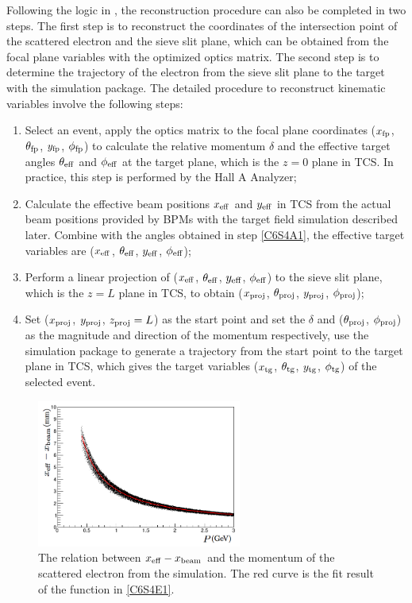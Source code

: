 Following the logic in , the reconstruction procedure can also be completed in two steps. The first step is to reconstruct the coordinates of the intersection point of the scattered electron and the sieve slit plane, which can be obtained from the focal plane variables with the optimized optics matrix. The second step is to determine the trajectory of the electron from the sieve slit plane to the target with the simulation package. The detailed procedure to reconstruct kinematic variables involve the following steps:
\begin{enumerate}[parsep=0pt]
\item \label{C6S4A1} Select an event, apply the optics matrix to the focal plane coordinates ($x_{\mathrm{fp}}$, $\theta_{\mathrm{fp}}$, $y_{\mathrm{fp}}$, $\phi_{\mathrm{fp}}$) to calculate the relative momentum $\delta$ and the effective target angles $\theta_{\mathrm{eff}}$ and $\phi_{\mathrm{eff}}$ at the target plane, which is the $z=0$ plane in TCS. In practice, this step is performed by the Hall A Analyzer;
\item \label{C6S4A2} Calculate the effective beam positions $x_{\mathrm{eff}}$ and $y_{\mathrm{eff}}$ in TCS from the actual beam positions provided by BPMs with the target field simulation described later. Combine with the angles obtained in step \ref{C6S4A1}, the effective target variables are ($x_{\mathrm{eff}}$, $\theta_{\mathrm{eff}}$, $y_{\mathrm{eff}}$, $\phi_{\mathrm{eff}}$);
\item Perform a linear projection of ($x_{\mathrm{eff}}$, $\theta_{\mathrm{eff}}$, $y_{\mathrm{eff}}$, $\phi_{\mathrm{eff}}$) to the sieve slit plane, which is the $z=L$ plane in TCS, to obtain ($x_{\mathrm{proj}}$, $\theta_{\mathrm{proj}}$, $y_{\mathrm{proj}}$, $\phi_{\mathrm{proj}}$);
\item Set ($x_{\mathrm{proj}}$, $y_{\mathrm{proj}}$, $z_{\mathrm{proj}}=L$) as the start point and set the $\delta$ and ($\theta_{\mathrm{proj}}$, $\phi_{\mathrm{proj}}$) as the magnitude and direction of the momentum respectively, use the simulation package to generate a trajectory from the start point to the target plane in TCS, which gives the target variables ($x_{\mathrm{tg}}$, $\theta_{\mathrm{tg}}$, $y_{\mathrm{tg}}$, $\phi_{\mathrm{tg}}$) of the selected event.
\end{enumerate}

\begin{figure}[b!]
  \centering
  \includegraphics[width=0.6\textwidth]{figs/effective-x-fit.png}
  \caption[Determine the effective beam position correction.]{The relation between $x_{\mathrm{eff}}-x_{\mathrm{beam}}$ and the momentum of the scattered electron from the simulation. The red curve is the fit result of the function in \cref{C6S4E1}. \label{C6S4F2}}
\end{figure}

